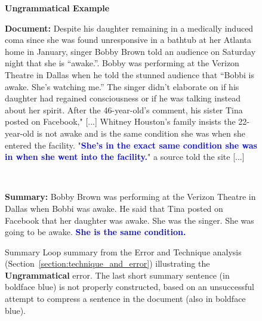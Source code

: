 \documentclass[11pt,a4paper]{article}
\begin{document}
\begin{figure*}[!htbp]
    \begin{framed}
        \begin{center}
            \large
            \textbf{Ungrammatical Example}
        \end{center}

        \textbf{Document:} Despite his daughter remaining in a medically induced coma since she was found unresponsive in a bathtub at her Atlanta home in January, singer Bobby Brown told an audience on Saturday night that she is ``awake.''. Bobby was performing at the Verizon Theatre in Dallas when he told the stunned audience that ``Bobbi is awake. She's watching me.'' The singer didn't elaborate on if his daughter had regained consciousness or if he was talking instead about her spirit. After the 46-year-old's comment, his sister Tina posted on Facebook," [...] Whitney Houston's family insists the 22-year-old is not awake and is the same condition she was when she entered the facility. "\textbf{\textcolor{blue}{She's in the exact same condition she was in when she went into the facility.}}" a source told the site [...]
         \begin{center}
            ~
        \end{center}
        \textbf{Summary:} Bobby Brown was performing at the Verizon Theatre in Dallas when Bobbi was awake. He said that Tina posted on Facebook that her daughter was awake. She was the singer. She was going to be awake. \textbf{\textcolor{blue}{She is the same condition.}}
    \end{framed}

    \caption{Summary Loop summary from the Error and Technique analysis (Section~\ref{section:technique_and_error}) illustrating the \textbf{Ungrammatical} error. The last short summary sentence (in boldface blue) is not properly constructed, based on an unsuccessful attempt to compress a sentence in the document (also in boldface blue).}
    \label{fig:extra_examples6}
\end{figure*}
\end{document}
